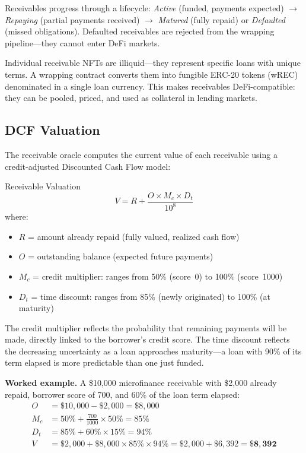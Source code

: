 \documentclass[11pt,a4paper]{article}
\begin{document}
Receivables progress through a lifecycle: \emph{Active} (funded, payments expected) $\rightarrow$ \emph{Repaying} (partial payments received) $\rightarrow$ \emph{Matured} (fully repaid) or \emph{Defaulted} (missed obligations). Defaulted receivables are rejected from the wrapping pipeline---they cannot enter DeFi markets.

Individual receivable NFTs are illiquid---they represent specific loans with unique terms. A wrapping contract converts them into fungible ERC-20 tokens (wREC) denominated in a single loan currency. This makes receivables DeFi-compatible: they can be pooled, priced, and used as collateral in lending markets.

\subsection{DCF Valuation}

The receivable oracle computes the current value of each receivable using a credit-adjusted Discounted Cash Flow model:

\begin{definitionbox}{Receivable Valuation}
\[
V = R + \frac{O \times M_c \times D_t}{10^8}
\]
where:
\begin{itemize}[label={$\cdot$}]
\item $R$ = amount already repaid (fully valued, realized cash flow)
\item $O$ = outstanding balance (expected future payments)
\item $M_c$ = credit multiplier: ranges from 50\% (score~0) to 100\% (score~1000)
\item $D_t$ = time discount: ranges from 85\% (newly originated) to 100\% (at maturity)
\end{itemize}
\end{definitionbox}

The credit multiplier reflects the probability that remaining payments will be made, directly linked to the borrower's credit score. The time discount reflects the decreasing uncertainty as a loan approaches maturity---a loan with 90\% of its term elapsed is more predictable than one just funded.

\textbf{Worked example.} A \$10{,}000 microfinance receivable with \$2{,}000 already repaid, borrower score of 700, and 60\% of the loan term elapsed:
\begin{align*}
O &= \$10{,}000 - \$2{,}000 = \$8{,}000 \\
M_c &= 50\% + \frac{700}{1000} \times 50\% = 85\% \\
D_t &= 85\% + 60\% \times 15\% = 94\% \\
V &= \$2{,}000 + \$8{,}000 \times 85\% \times 94\% = \$2{,}000 + \$6{,}392 = \mathbf{\$8{,}392}
\end{align*}
\end{document}
